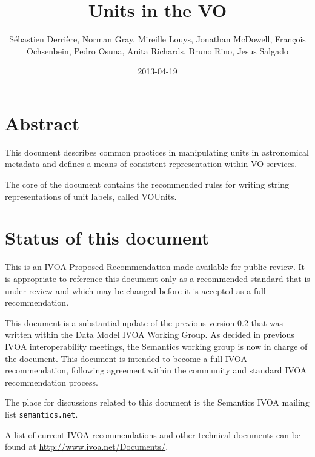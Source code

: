 \documentclass[11pt,notitlepage,onecolumn]{ivoa}
\title{Units in the VO}
\date{2013-04-19}
\author{S\'{e}bastien Derri\`ere,
Norman Gray,
Mireille Louys,
Jonathan McDowell,
Fran\c{c}ois Ochsenbein,
Pedro Osuna,
Anita Richards,
Bruno Rino,
Jesus Salgado}
\begin{document}
\maketitle %
\thispagestyle{empty}
\begingroup
\vfill
\endgroup
\newpage
\tableofcontents 
\newpage
\section*{Abstract}

This document describes common practices in manipulating
units in astronomical metadata and defines a means of consistent
representation within VO services.

The core of the document contains the recommended rules for writing string representations 
of unit labels, called VOUnits.

\section*{Status of this document}

This is an IVOA Proposed Recommendation made available for public review.
It is appropriate to reference this document only as a recommended standard 
that is under review and which may be changed before it is accepted as a full recommendation.


This document is a substantial update of the previous version 0.2 that
was written within the Data Model IVOA Working Group. As decided in previous
IVOA interoperability meetings, the Semantics working group is now in charge 
of the document. This document is intended to become a full IVOA recommendation,
following agreement within the community and standard IVOA recommendation process.

The place for discussions related to this document is the
Semantics IVOA mailing list {\tt semantics\@@ivoa.net}.


A list of current IVOA recommendations and other technical documents can be found at
\url{http://www.ivoa.net/Documents/}.
\end{document}
